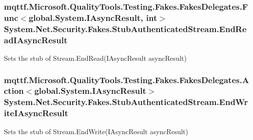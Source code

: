 \hypertarget{class_system_1_1_net_1_1_security_1_1_fakes_1_1_stub_authenticated_stream_aa340d843e7a32798dfcfd4c949d15c7a}{
\subsubsection[{End\-Read\-I\-Async\-Result}]{\setlength{\rightskip}{0pt plus 5cm}mqttf.\-Microsoft.\-Quality\-Tools.\-Testing.\-Fakes.\-Fakes\-Delegates.\-Func$<$global.\-System.\-I\-Async\-Result, int$>$ System.\-Net.\-Security.\-Fakes.\-Stub\-Authenticated\-Stream.\-End\-Read\-I\-Async\-Result}}\label{class_system_1_1_net_1_1_security_1_1_fakes_1_1_stub_authenticated_stream_aa340d843e7a32798dfcfd4c949d15c7a}


Sets the stub of Stream.\-End\-Read(\-I\-Async\-Result async\-Result)

\hypertarget{class_system_1_1_net_1_1_security_1_1_fakes_1_1_stub_authenticated_stream_ac789c142ac2799d030e99ded8e9b71d4}{
\subsubsection[{End\-Write\-I\-Async\-Result}]{\setlength{\rightskip}{0pt plus 5cm}mqttf.\-Microsoft.\-Quality\-Tools.\-Testing.\-Fakes.\-Fakes\-Delegates.\-Action$<$global.\-System.\-I\-Async\-Result$>$ System.\-Net.\-Security.\-Fakes.\-Stub\-Authenticated\-Stream.\-End\-Write\-I\-Async\-Result}}\label{class_system_1_1_net_1_1_security_1_1_fakes_1_1_stub_authenticated_stream_ac789c142ac2799d030e99ded8e9b71d4}


Sets the stub of Stream.\-End\-Write(\-I\-Async\-Result async\-Result)

